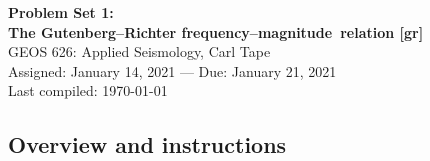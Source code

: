 \documentclass[11pt,titlepage,fleqn]{article}
\newcommand{\fmag}{frequency--magnitude}
\begin{document}

\begin{spacing}{1.2}
\centering
{\large \bf Problem Set 1: \\
The Gutenberg--Richter \fmag\ relation [gr]} \\
GEOS 626: Applied Seismology, Carl Tape \\
Assigned: January 14, 2021 --- Due: January 21, 2021 \\
Last compiled: \today
\end{spacing}


\subsection*{Overview and instructions}
\end{document}
